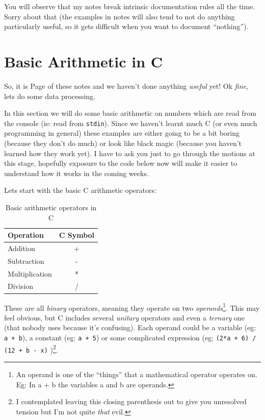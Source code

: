\documentclass{lab}
\begin{document}
You will observe that my notes break intrinsic documentation rules all the time. Sorry about that (the examples in notes will also tend to not do anything particularly useful, so it gets difficult when you want to document ``nothing'').

\pagebreak
\section{Basic Arithmetic in C}

So, it is Page \thepage{} of these notes and we haven't done anything \textit{useful} yet! Ok \textit{fine}, lets do some data processing.

In this section we will do some basic arithmetic on numbers which are read from the console (ie: read from \texttt{stdin}). Since we haven't learnt much C (or even much programming in general) these examples are either going to be a bit boring (because they don't do much) or look like black magic (because you haven't learned how they work yet). I have to ask you just to go through the motions at this stage, hopefully exposure to the code below now will make it easier to understand how it works in the coming weeks.

Lets start with the basic C arithmetic operators:

\begin{table}[H]
\centering
\begin{tabular}{|l|c|}
\hline
Operation      & C Symbol \\
\hline
Addition       & +        \\
Subtraction    & -        \\
Multiplication & *        \\
Division       & /       \\
\hline
\end{tabular}
\caption{Basic arithmetic operators in C}
\end{table}

These are all \textit{binary} operators, meaning they operate on two \textit{operands}\footnote{An operand is one of the ``things'' that a mathematical operator operates on. Eg: In a + b the variables a and b are operands.}. This may feel obvious, but C includes several \textit{unitary} operators and even a \textit{ternary} one (that nobody uses because it's confusing). Each operand could be a variable (eg: \texttt{a + b}), a constant (eg: \texttt{a + 5}) or some complicated expression (eg: \texttt{(2*a + 6) / (12 + b - x)} )\footnote{I contemplated leaving this closing parenthesis out to give you unresolved tension but I'm not quite \textit{that} evil.}.
\end{document}
